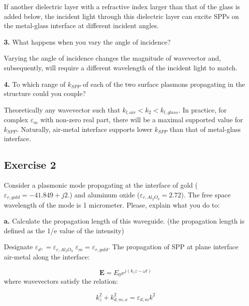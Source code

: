 \documentclass[11pt,a4paper]{article}
\begin{document}
If another dielectric layer with a refractive index larger than that of the glass is added below, the incident light through this dielectric layer can excite SPPs on the metal-glass interface at different incident angles.

\begin{displayquote}
\textbf{3.} What happens when you vary the angle of incidence?
\end{displayquote}
Varying the angle of incidence changes the magnitude of wavevector and, subsequently, will require a different wavelength of the incident light to match. 

\begin{displayquote}
\textbf{4.} To which range of $k_{SPP}$ of each of the two surface plasmons propagating in the structure could you couple?
\end{displayquote}
Theoretically any wavevector such that $k_{l,air} < k_2 < k_{l,glass}$. In practice, for complex $\varepsilon_m$ with non-zero real part, there will be a maximal supported value for $k_{SPP}$. Naturally, air-metal interface supports lower $k_{SPP}$ than that of metal-glass interface.

\subsection*{Exercise 2}

Consider a plasmonic mode propagating at the interface of gold ($\varepsilon_{r,gold} = −41.849 + j2$.) and aluminum oxide ($\varepsilon_{r,Al_2O_3} = 2.72$). The free space wavelength of the mode is 1 micrometer. Please, explain what you do to:

\begin{displayquote}
    \textbf{a.}  Calculate the propagation length of this waveguide. (the propagation length is defined as the 1/e value of the intensity)
\end{displayquote}

 Designate $\varepsilon_d, = \varepsilon_{r,Al_2O_3}  \; \varepsilon_m = \varepsilon_{r,gold}$.
The propagation of SPP at plane interface air-metal along the interface:

\begin{equation}
    \textbf{E}  = E_0 e^{j (k_z z - \omega t)}
\end{equation}
where wavevectors satisfy the relation:

\begin{equation}
    k^2_z+k^2_{d,m,x} = \varepsilon_{d,m} k^2
\end{equation}
\end{document}
